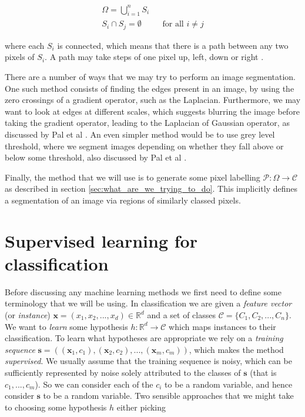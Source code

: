 \documentclass[12pt,twoside,notitlepage]{report}
\newcommand{\vc}[1]{\mathbf{#1}}
\newcommand{\cl}[1]{\mathcal{#1}}
\newcommand{\bb}[1]{\mathbb{#1}}
\begin{document}
        \begin{align}
            \Omega = \bigcup\limits_{i=1}^n S_i \\
            S_i \cap S_j = \emptyset && \text{for all } i \neq j 
        \end{align}

        where each $S_i$ is connected, which means that there is a path between any two pixels of $S_i$. 
        A path may take steps of one pixel up, left, down or right \cite{PAL19931277}. 

        There are a number of ways that we may try to perform an image segmentation. One such method consists of 
        finding the edges present in an image, by using the zero crossings of a gradient operator, 
        such as the Laplacian. Furthermore, we may want to look at edges at different scales, which suggests blurring 
        the image before taking the gradient operator, leading to the Laplacian of Gaussian operator, as discussed by 
        Pal et al \cite{PAL19931277}. An even simpler method would be to use grey level threshold, where we segment 
        images depending on whether they fall above or below some threshold, also discussed by Pal et al \cite{PAL19931277}.

        Finally, the method that we will use is to generate some pixel labelling $\cl{P}:\Omega \rightarrow \cl{C}$ as 
        described in section \ref{sec:what_are_we_trying_to_do}. This implicitly defines a segmentation of an image 
        via regions of similarly classed pixels.




    \section{Supervised learning for classification} \label{sec:supervised_learning}
        Before discussing any machine learning methods we first need to define some terminology that we will be using. 
        In classification we are given a \textit{feature vector} (or \textit{instance}) $\vc{x} = (x_1, x_2, ..., x_d) 
        \in \bb{R}^d$ and a set of classes $\cl{C} = \{C_1, C_2, ..., C_n\}$. We want to \textit{learn} some 
        hypothesis $h:\bb{R}^d \rightarrow \cl{C}$ which maps instances to their classification. To learn 
        what hypotheses are appropriate we rely on a \textit{training sequence} $\vc{s} = ((\vc{x}_1, c_1), 
        (\vc{x}_2, c_2), ..., (\vc{x}_m, c_m))$, which makes the method \textit{supervised}. We usually assume that 
        the training sequence is noisy, which can be sufficiently represented by noise solely attributed to the classes of $\vc{s}$ 
        (that is $c_1, ..., c_m$). So we can consider each of the $c_i$ to be a random variable, and hence consider 
        $\vc{s}$ to be a random variable. Two sensible approaches that we might take to choosing some hypothesis $h$ 
        either picking
\end{document}

